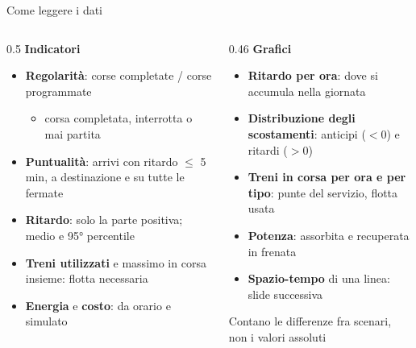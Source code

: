 \documentclass[11pt,aspectratio=169]{beamer}
\begin{document}
\begin{frame}[squeeze]{Come leggere i dati}
	\vspace*{-0.4cm}
	\begin{columns}[T]
		\begin{column}{0.5\textwidth}
			\textbf{\color{mrsAzzurro}Indicatori}
			\small
			\begin{itemize}
				\item \textbf{Regolarità}: corse completate / corse programmate
				\begin{itemize}
					\item corsa completata, interrotta o mai partita
				\end{itemize}
				\item \textbf{Puntualità}: arrivi con ritardo $\le$ 5 min, a destinazione e su tutte le fermate
				\item \textbf{Ritardo}: solo la parte positiva; medio e 95° percentile
				\item \textbf{Treni utilizzati} e massimo in corsa insieme: flotta necessaria
				\item \textbf{Energia} e \textbf{costo}: da orario e simulato
			\end{itemize}
		\end{column}
		\begin{column}{0.46\textwidth}
			\textbf{\color{mrsAzzurro}Grafici}
			\small
			\begin{itemize}
				\item \textbf{Ritardo per ora}: dove si accumula nella giornata
				\item \textbf{Distribuzione degli scostamenti}: anticipi ($<0$) e ritardi ($>0$)
				\item \textbf{Treni in corsa per ora e per tipo}: punte del servizio, flotta usata
				\item \textbf{Potenza}: assorbita e recuperata in frenata
				\item \textbf{Spazio-tempo} di una linea: slide successiva
			\end{itemize}
			\begin{alertblock}{}
				Contano le differenze fra scenari, non i valori assoluti
			\end{alertblock}
		\end{column}
	\end{columns}
\end{frame}
\end{document}
